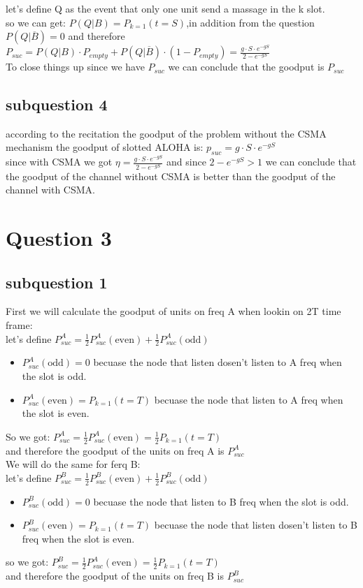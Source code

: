 \documentclass{article}
\begin{document}
let's define Q as the event that only one unit send a massage in the k slot.\\
so we can get: $P(Q|B) = P_{k=1}(t=S)$,in addition from the question $P(Q|\overline{B}) = 0$ and therefore \\
$P_{suc} = P(Q|B)\cdot P_{empty}+P(Q|\overline{B})\cdot (1-P_{empty}) = \frac{g\cdot S \cdot e^{-gS}}{2-e^{-gS}}$ \\
To close things up since we have $P_{suc}$ we can conclude that the goodput is $P_{suc}$
\subsection{subquestion 4}
according to the recitation the goodput of the problem without the CSMA mechanism the goodput of slotted ALOHA is: $p_{suc} = g\cdot S \cdot e^{-gS}$\\
since with CSMA we got $\eta = \frac{g\cdot S \cdot e^{-gS}}{2-e^{-gS}}$ and since $2-e^{-gS} > 1$ we can conclude that the goodput of the channel without CSMA is better than the goodput of the channel with CSMA.

\section{Question 3}
\subsection{subquestion 1}
First we will calculate the goodput of units on freq A when lookin on 2T time frame:\\
let's define $P^A_{suc} = \frac12 P^A_{suc}(\text{even})+ \frac12 P^A_{suc}(\text{odd})$ \\
\begin{itemize}
    \item $P^A_{suc}(\text{odd}) = 0$ becuase the node that listen dosen't listen to A freq when the slot is odd.
    \item $P^A_{suc}(\text{even}) = P_{k=1}(t=T)$ becuase the node that listen to A freq when the slot is even.
\end{itemize}
So we got: $P^A_{suc} =\frac12 P^A_{suc}(\text{even}) = \frac12 P_{k=1}(t=T)$\\
and therefore the goodput of the units on freq A is $P^A_{suc}$\\

We will do the same for ferq B:\\
let's define $P^B_{suc} = \frac12 P^B_{suc}(\text{even})+ \frac12 P^B_{suc}(\text{odd})$ \\
\begin{itemize}
    \item $P^B_{suc}(\text{odd}) = 0$ becuase the node that listen to B freq when the slot is odd.
    \item $P^B_{suc}(\text{even}) = P_{k=1}(t=T)$  becuase the node that listen dosen't listen to B freq when the slot is even.
\end{itemize}
so we got: $P^B_{suc} =\frac12 P^A_{suc}(\text{even}) = \frac12 P_{k=1}(t=T)$\\
and therefore the goodput of the units on freq B is $P^B_{suc}$\\
\end{document}
